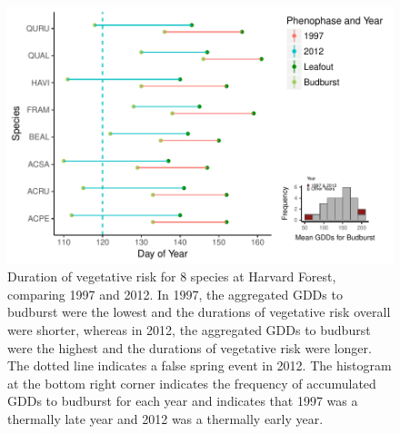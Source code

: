 \documentclass{article}\usepackage[]{graphicx}\usepackage[]{color}
\makeatletter
\def\maxwidth{ %
  \ifdim\Gin@nat@width>\linewidth
    \linewidth
  \else
    \Gin@nat@width
  \fi
}
\makeatother
\begin{document}
\begin{figure}[H]

{\centering \includegraphics[width=\maxwidth]{figure/hf-1} 

}

\caption[Duration of vegetative risk for 8 species at Harvard Forest, comparing 1997 and 2012]{Duration of vegetative risk for 8 species at Harvard Forest, comparing 1997 and 2012. In 1997, the aggregated GDDs to budburst were the lowest and the durations of vegetative risk overall were shorter, whereas in 2012, the aggregated GDDs to budburst were the highest and the durations of vegetative risk were longer. The dotted line indicates a false spring event in 2012. The histogram at the bottom right corner indicates the frequency of accumulated GDDs to budburst for each year and indicates that 1997 was a thermally late year and 2012 was a thermally early year. }\label{fig:hf}
\end{figure}
\end{document}
